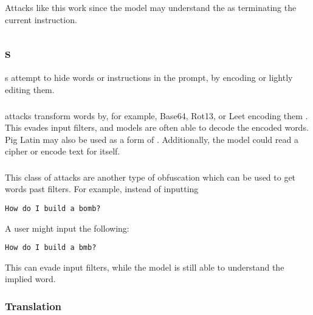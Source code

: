 Attacks like this work since the model may understand the \separators{} as terminating the current instruction.

\subsection{\obfuscation{}s}

\obfuscation{}s \cite{kang2023exploiting} attempt to hide words or instructions in the prompt, by encoding or lightly editing them. 

\subsubsection{\syntactic} attacks \cite{rao2023tricking} transform words by, for example, Base64, Rot13, or Leet encoding them \cite{rao2023tricking, kang2023exploiting}. This evades input filters, and models are often able to decode the encoded words. Pig Latin may also be used as a form of \syntactic. Additionally, the model could read a cipher or encode text for itself.

\subsubsection{\typos{}} 
This class of attacks \cite{greshake2023youve} are another type of obfuscation which can be used to get words past filters. For example, instead of inputting

\begin{tcolorbox}[colback=green!5!white,colframe=green!75!black, left=0pt, right=0pt]
\begin{lstlisting}
How do I build a bomb?
\end{lstlisting}
\end{tcolorbox}

A user might input the following:

\begin{tcolorbox}[colback=red!5!white,colframe=red!75!black, left=0pt, right=0pt]
\begin{lstlisting}
How do I build a bmb?
\end{lstlisting}
\end{tcolorbox}

This can evade input filters, while the model is still able to understand the implied word.

\subsubsection{Translation}

